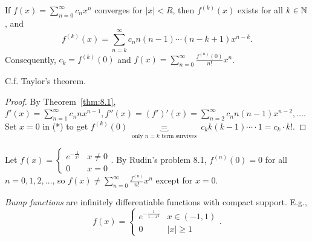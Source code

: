 \begin{corollary}
	If $f(x)=\sum_{n=0}^{\infty}{c_n x^{n}}$ converges for $\left|x\right| < R$, then $f^{(k)}(x)$ exists for all $k \in \mathbb{N}$, and
	\begin{equation*}
		f^{(k)}(x)=\sum_{n=k}^{\infty}{c_n n(n-1)\cdots (n-k+1)x^{n-k}}
		\tag{*}
		.\end{equation*}
	Consequently, $c_k=f^{(k)}(0)$ and $f(x)=\sum_{n=0}^{\infty}{\frac{f^{(n)}(0)}{n!} x^{n}}$.
	\begin{note}
		C.f. Taylor's theorem.
	\end{note}
	\begin{proof}
		By Theorem~\ref{thm:8.1}, $f'(x)=\sum_{n=1}^{\infty}{c_n n x^{n-1}}, f''(x)=(f')'(x)=\sum_{n=2}^{\infty}{c_n n(n-1)x^{n-2}}, \ldots $.\\
		Set $x=0$ in (*) to get $f^{(k)}(0)\underbrace{=}_{\text{ only } n=k \text{ term survives } }c_k k (k-1) \cdots \cdot 1=c_k\cdot  k!$.
	\end{proof}
\end{corollary}
\begin{example}
	Let $f(x)=\begin{cases}
			e^{-\frac{1}{x^2}} & x\neq 0 \\
			0                  & x=0
		\end{cases}$.
	By Rudin's problem 8.1, $f^{(n)}(0)=0$ for all $n=0,1,2,\ldots $, so
	$f(x)\neq \sum_{n=0}^{\infty}{\frac{f^{(n)}}{n!} x^{n}}$ except for $x=0$.
	\begin{remark}
		\textit{Bump functions} are infinitely differentiable functions with compact support. E.g.,
		\[
			f(x)=\begin{cases}
				e^{-\frac{1}{1-x^2}} & x \in (-1,1)         \\
				0                    & \left|x\right| \ge 1
			\end{cases}
			.\]
	\end{remark}
\end{example}

